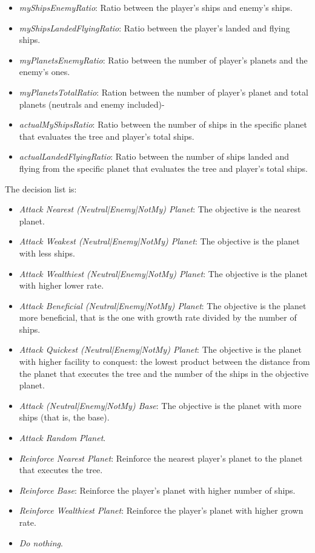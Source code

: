 \begin{itemize}
\item {\em myShipsEnemyRatio}: Ratio between the player's ships and enemy's ships.
\item {\em myShipsLandedFlyingRatio}: Ratio between the player's landed and flying ships.
\item {\em myPlanetsEnemyRatio}: Ratio between the number of player's planets and the enemy's ones.
\item {\em myPlanetsTotalRatio}: Ration between the number of player's planet and total planets (neutrals and enemy included)-
\item {\em actualMyShipsRatio}: Ratio between the number of ships in the specific planet that evaluates the tree and player's total ships.
\item {\em actualLandedFlyingRatio}: Ratio between the number of ships landed and flying from the specific planet that evaluates the tree and player's total ships.
\end{itemize}

The decision list is:

\begin{itemize}
\item {\em Attack Nearest (Neutral|Enemy|NotMy) Planet}: The objective is the nearest planet.
\item {\em Attack Weakest (Neutral|Enemy|NotMy) Planet}: The objective is the planet with less ships.
\item {\em Attack Wealthiest (Neutral|Enemy|NotMy) Planet}: The objective is the planet with higher lower rate.
\item {\em Attack Beneficial (Neutral|Enemy|NotMy) Planet}: The objective is the planet more beneficial, that is the one with growth rate divided by the number of ships.
\item {\em Attack Quickest (Neutral|Enemy|NotMy) Planet}: The objective is the planet with higher facility to conquest: the lowest product between the distance from the planet that executes the tree and the number of the ships in the objective planet.
\item {\em Attack (Neutral|Enemy|NotMy) Base}: The objective is the planet with more ships (that is, the base).
\item {\em  Attack Random Planet}.
\item {\em Reinforce Nearest Planet}: Reinforce the nearest player's planet to the planet that executes the tree.
\item {\em Reinforce Base}: Reinforce the player's planet with higher number of ships.
\item {\em Reinforce Wealthiest Planet}: Reinforce the player's planet with higher grown rate.
\item {\em Do nothing}.


\end{itemize}

